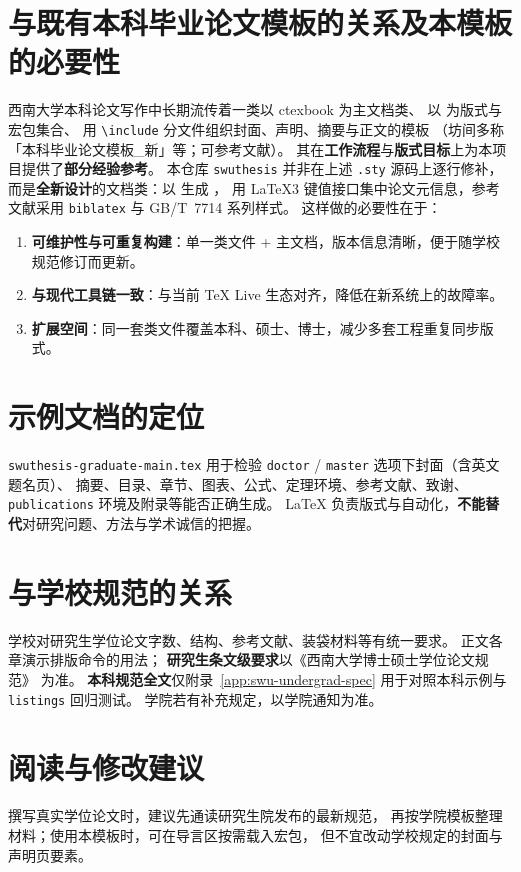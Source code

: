 \section{与既有本科毕业论文模板的关系及本模板的必要性}
西南大学本科论文写作中长期流传着一类以 \textsf{ctexbook} 为主文档类、%
以  为版式与宏包集合、%
用 \texttt{\textbackslash include} 分文件组织封面、声明、摘要与正文的模板%
（坊间多称「本科毕业论文模板\_新」等；可参考文献\cite{bao2024swuthesisLegacy}）。
其在\textbf{工作流程}与\textbf{版式目标}上为本项目提供了\textbf{部分经验参考}。%
本仓库 \texttt{swuthesis} 并非在上述 \texttt{.sty} 源码上逐行修补，%
而是\textbf{全新设计}的文档类：以  生成 ，%
用 \LaTeX3 键值接口集中论文元信息，参考文献采用 \texttt{biblatex} 与 GB/T~7714 系列样式。%
这样做的必要性在于：
\begin{enumerate}[label=\arabic*., leftmargin=2em]
  \item \textbf{可维护性与可重复构建}：单一类文件 + 主文档，版本信息清晰，便于随学校规范修订而更新。
  \item \textbf{与现代工具链一致}：与当前 \TeX{} Live 生态对齐，降低在新系统上的故障率。
  \item \textbf{扩展空间}：同一套类文件覆盖本科、硕士、博士，减少多套工程重复同步版式。
\end{enumerate}

\section{示例文档的定位}
\texttt{swuthesis-graduate-main.tex} 用于检验 \texttt{doctor} / \texttt{master} 选项下封面（含英文题名页）、%
摘要、目录、章节、图表、公式、定理环境、参考文献、致谢、%
\texttt{publications} 环境及附录等能否正确生成。%
\LaTeX{} 负责版式与自动化，\textbf{不能替代}对研究问题、方法与学术诚信的把握。

\section{与学校规范的关系}
学校对研究生学位论文字数、结构、参考文献、装袋材料等有统一要求。%
正文各章演示排版命令的用法；%
\textbf{研究生条文级要求}以《西南大学博士硕士学位论文规范》%
\cite{swu2022gradThesisSpecDoc} 为准。%
\textbf{本科规范全文}仅附录~\ref{app:swu-undergrad-spec} 用于对照本科示例与 \texttt{listings} 回归测试。%
学院若有补充规定，以学院通知为准。

\section{阅读与修改建议}
撰写真实\swuThesisTierZh 学位论文时，建议先通读研究生院发布的最新规范，%
再按学院模板整理材料；使用本模板时，可在导言区按需载入宏包，%
但不宜改动学校规定的封面与声明页要素。

